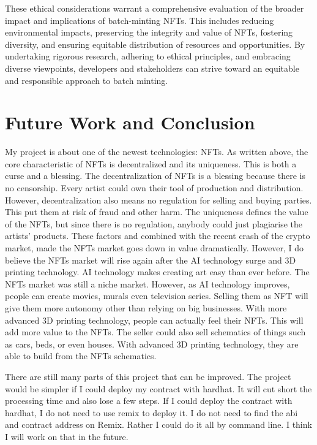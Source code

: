 \documentclass[10pt,twocolumn]{article}
\begin{document}
These ethical considerations warrant a comprehensive evaluation of the broader impact and implications of batch-minting NFTs. This includes reducing environmental impacts, preserving the integrity and value of NFTs, fostering diversity, and ensuring equitable distribution of resources and opportunities. By undertaking rigorous research, adhering to ethical principles, and embracing diverse viewpoints, developers and stakeholders can strive toward an equitable and responsible approach to batch minting.

\section{Future Work and Conclusion}
My project is about one of the newest technologies: NFTs. As written above, the core characteristic of NFTs is decentralized and its uniqueness. This is both a curse and a blessing. The decentralization of NFTs is a blessing because there is no censorship. Every artist could own their tool of production and distribution.  However, decentralization also means no regulation  for selling and buying parties. This put them at risk of fraud and other harm. The uniqueness defines the value of the NFTs, but since there is no regulation, anybody could just plagiarise the artists’ products. These factors and combined with the recent crash of the crypto market, made the NFTs market goes down in value dramatically.
However, I do believe the NFTs market will rise again after the AI technology surge and 3D printing technology. AI technology makes creating art easy than ever before. The NFTs market was still a niche market. However, as AI technology improves, people can create movies, murals even television series. Selling them as NFT will give them more autonomy other than relying on big businesses. With more advanced 3D printing technology, people can actually feel their NFTs. This will add more value to the NFTs. The seller could also sell schematics of things such as cars, beds, or even houses. With advanced 3D printing technology, they are able to build from the NFTs schematics.

There are still many parts of this project that can be improved. The project would be simpler if I could deploy my contract with hardhat. It will cut short the processing time and also lose a few steps. If I could deploy the contract with hardhat, I do not need to use remix to deploy it. I do not need to find the abi and contract address on Remix. Rather I could do it all by command line. I think I will work on that in the future.
\end{document}

